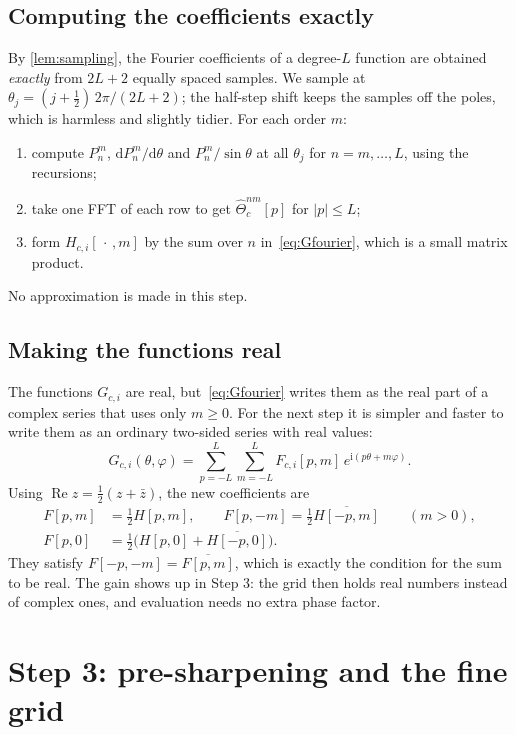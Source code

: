 \documentclass[11pt,a4paper]{article}
\theoremstyle{definition}
\renewcommand{\Re}{\operatorname{Re}}
\newcommand{\ii}{\mathrm{i}}
\newcommand{\dd}{\mathrm{d}}
\begin{document}
\subsection{Computing the coefficients exactly}
By \cref{lem:sampling}, the Fourier coefficients of a degree-$L$ function are obtained \emph{exactly} from $2L+2$ equally
spaced samples. We sample at $\theta_j=(j+\tfrac12)\,2\pi/(2L+2)$; the half-step shift keeps the samples off the poles, which is
harmless and slightly tidier. For each order $m$:
\begin{enumerate}
\item compute $P_n^m$, $\dd P_n^m/\dd\theta$ and $P_n^m/\sin\theta$ at all $\theta_j$ for $n=m,\dots,L$, using the recursions;
\item take one FFT of each row to get $\widehat\Theta_c^{nm}[p]$ for $|p|\le L$;
\item form $H_{c,i}[\,\cdot\,,m]$ by the sum over $n$ in~\eqref{eq:Gfourier}, which is a small matrix product.
\end{enumerate}
No approximation is made in this step.

\subsection{Making the functions real}\label{sec:real}
The functions $G_{c,i}$ are real, but~\eqref{eq:Gfourier} writes them as the real part of a complex series that uses
only $m\ge0$. For the next step it is simpler and faster to write them as an ordinary two-sided series with real values:
\begin{equation}\label{eq:Freal}
G_{c,i}(\theta,\varphi)=\sum_{p=-L}^{L}\sum_{m=-L}^{L}F_{c,i}[p,m]\,e^{\ii(p\theta+m\varphi)} .
\end{equation}
Using $\Re z=\tfrac12(z+\bar z)$, the new coefficients are
\begin{align}
F[p,m]&=\tfrac12H[p,m],\qquad F[p,-m]=\tfrac12\overline{H[-p,m]}\qquad(m>0),\\
F[p,0]&=\tfrac12\big(H[p,0]+\overline{H[-p,0]}\big).
\end{align}
They satisfy $F[-p,-m]=\overline{F[p,m]}$, which is exactly the condition for the sum to be real. The gain shows up in
Step 3: the grid then holds real numbers instead of complex ones, and evaluation needs no extra phase factor.

\section{Step 3: pre-sharpening and the fine grid}\label{sec:step3}
\end{document}
